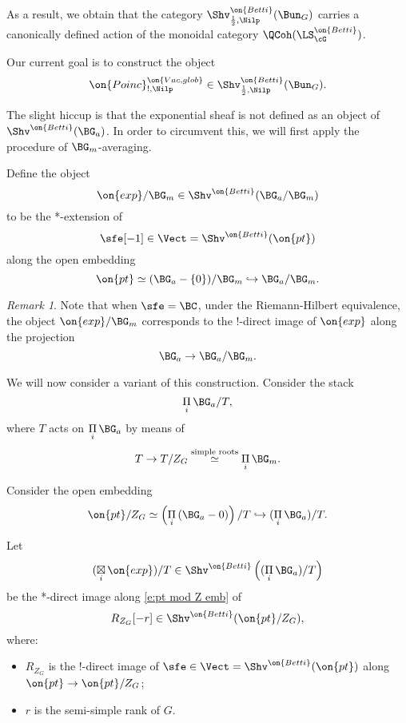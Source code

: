 \documentclass[9pt]{amsart}
\theoremstyle{remark}
\newtheorem{rem}[subsubsection]{Remark}
\theoremstyle{definition}
\theoremstyle{remark}
\numberwithin{equation}{section}
\begin{document}
As a result, we obtain that the category $\Shv^{\on{Betti}}_{\frac{1}{2},\Nilp}(\Bun_G)$ carries
a canonically defined action of the monoidal category $\QCoh(\LS^{\on{Betti}}_\cG)$.

 \label{ss:Poinc Betti}

Our current goal is to construct the object 
\begin{equation} \label{e:Poinc Betti}
\on{Poinc}^{\on{Vac,glob}}_{!,\Nilp}\in \Shv^{\on{Betti}}_{\frac{1}{2},\Nilp}(\Bun_G).
\end{equation}

The slight hiccup is that the exponential sheaf is not defined as an object of
$\Shv^{\on{Betti}}(\BG_a)$. In order to circumvent this, we will first apply the procedure of $\BG_m$-averaging.

\sssec{}

Define the object
$$\on{exp}/\BG_m\in \Shv^{\on{Betti}}(\BG_a/\BG_m)$$
to be the *-extension of 
$$\sfe[-1]\in \Vect=\Shv^{\on{Betti}}(\on{pt})$$ along the open embedding
$$\on{pt}\simeq (\BG_a-\{0\})/\BG_m\hookrightarrow \BG_a/\BG_m.$$

\begin{rem} \label{r:Kir}
Note that when $\sfe=\BC$, under the Riemann-Hilbert equivalence, the object $\on{exp}/\BG_m$
corresponds to the !-direct image of $\on{exp}$ along the projection
$$\BG_a\to \BG_a/\BG_m.$$
\end{rem}

\sssec{}

We will now consider a variant of this construction. Consider the stack 
$$\underset{i}\Pi\, \BG_a/T,$$
where $T$ acts on $\underset{i}\Pi\, \BG_a$ by means of
$$T\to T/Z_G\overset{\text{simple roots}}\simeq \underset{i}\Pi\, \BG_m.$$

Consider the open embedding
\begin{equation} \label{e:pt mod Z emb}
\on{pt}/Z_G \simeq \left(\underset{i}\Pi\, (\BG_a-0)\right)/T\hookrightarrow (\underset{i}\Pi\, \BG_a)/T.
\end{equation}

Let 
$$(\underset{i}\boxtimes\, \on{exp})/T\in \Shv^{\on{Betti}}\left((\underset{i}\Pi\, \BG_a)/T\right)$$
be the *-direct image along \eqref{e:pt mod Z emb} of
$$R_{Z_G}[-r]\in \Shv^{\on{Betti}}(\on{pt}/Z_G),$$ 
where:

\begin{itemize}

\item $R_{Z_G}$ is the !-direct image of $\sfe\in \Vect=\Shv^{\on{Betti}}(\on{pt})$
along $\on{pt}\to \on{pt}/Z_G$;

\item $r$ is the semi-simple rank of $G$.

\end{itemize} 
\end{document}
